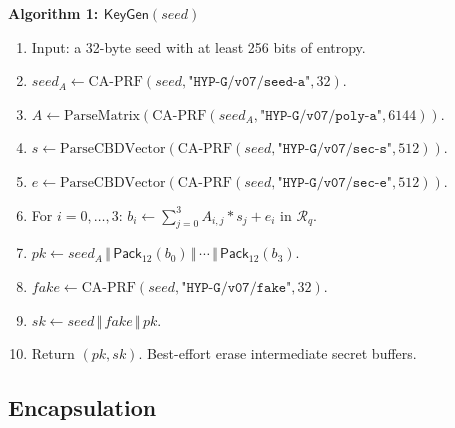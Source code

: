 \documentclass[11pt,a4paper]{article}
\theoremstyle{plain}
\theoremstyle{definition}
\theoremstyle{remark}
\newcommand{\concat}{\,\Vert\,}
\newcommand{\Ring}{\mathcal{R}_q}
\newcommand{\KeyGen}{\mathsf{KeyGen}}
\newcommand{\Pack}{\mathsf{Pack}}
\newenvironment{steps}[1]
  {\par\medskip\noindent\textbf{#1}\par\nopagebreak\small
   \begin{enumerate}[label=\arabic*:,leftmargin=*]}
  {\end{enumerate}\par\medskip}
\begin{document}
\begin{steps}{Algorithm 1: $\KeyGen(\mathit{seed})$}
\item Input: a 32-byte seed with at least 256 bits of entropy.
\item $\mathit{seed}_A\gets\mathrm{CA\text{-}PRF}(\mathit{seed},
  \texttt{"HYP-G/v07/seed-a"},32)$.
\item $A\gets\mathrm{ParseMatrix}(
  \mathrm{CA\text{-}PRF}(\mathit{seed}_A,
  \texttt{"HYP-G/v07/poly-a"},6144))$.
\item $s\gets\mathrm{ParseCBDVector}(
  \mathrm{CA\text{-}PRF}(\mathit{seed},
  \texttt{"HYP-G/v07/sec-s"},512))$.
\item $e\gets\mathrm{ParseCBDVector}(
  \mathrm{CA\text{-}PRF}(\mathit{seed},
  \texttt{"HYP-G/v07/sec-e"},512))$.
\item For $i=0,\ldots,3$: $b_i\gets
  \sum_{j=0}^{3}A_{i,j}*s_j+e_i$ in $\Ring$.
\item $pk\gets\mathit{seed}_A\concat\Pack_{12}(b_0)\concat\cdots
  \concat\Pack_{12}(b_3)$.
\item $\mathit{fake}\gets\mathrm{CA\text{-}PRF}(\mathit{seed},
  \texttt{"HYP-G/v07/fake"},32)$.
\item $sk\gets\mathit{seed}\concat\mathit{fake}\concat pk$.
\item Return $(pk,sk)$.  Best-effort erase intermediate secret buffers.
\end{steps}

\subsection{Encapsulation}
\end{document}
